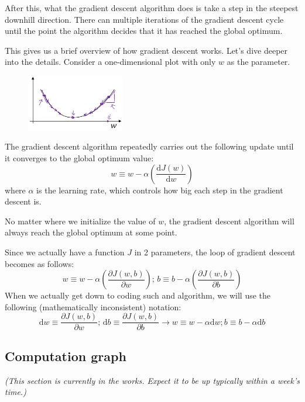 \documentclass{article}[a4paper,12pt]
\theoremstyle{definition}
\begin{document}
After this, what the gradient descent algorithm does is take a step in the steepest downhill direction. There can multiple iterations of the gradient descent cycle until the point the algorithm decides that it has reached the global optimum. 
\vspace{6pt}

This gives us a brief overview of how gradient descent works. Let's dive deeper into the details. Consider a one-dimensional plot with only $w$ as the parameter.
\begin{figure}
\centering \includegraphics[width=0.38\textwidth]{1d_convex_plot.png}
\end{figure}
\vspace{6pt}

The gradient descent algorithm repeatedly carries out the following update until it converges to the global optimum value:
$$w\equiv w-\alpha\left(\frac{\text{d}J(w)}{\text{d}w}\right)$$
where $\alpha$ is the learning rate, which controls how big each step in the gradient descent is. 
\vspace{6pt}

No matter where we initialize the value of $w$, the gradient descent algorithm will always reach the global optimum at some point. 
\vspace{6pt}

Since we actually have a function $J$ in 2 parameters, the loop of gradient descent becomes as follows:
$$w\equiv w-\alpha\left(\frac{\partial J(w,b)}{\partial w}\right)\text{; } b\equiv b-\alpha\left(\frac{\partial J(w,b)}{\partial b}\right)$$
When we actually get down to coding such and algorithm, we will use the following (mathematically inconsistent) notation:
$$\text{d}w\equiv \frac{\partial J(w,b)}{\partial w} \text{; } \text{d}b\equiv \frac{\partial J(w,b)}{\partial b}\longrightarrow w\equiv w-\alpha\text{d}w; b\equiv b-\alpha\text{d}b$$ 
\subsection{Computation graph}
\textit{(This section is currently in the works. Expect it to be up typically within a week's time.)}

\hrulefill
\end{document}

